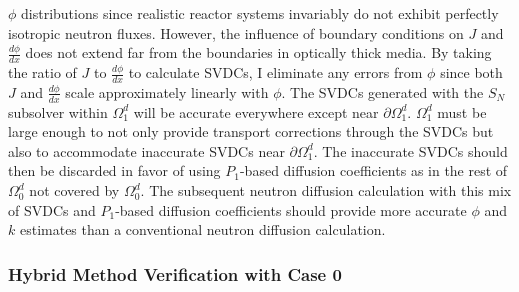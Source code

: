 $\phi$ distributions since realistic reactor systems invariably do not exhibit perfectly isotropic
neutron fluxes. However, the influence of boundary conditions on $J$ and $\frac{d\phi}{dx}$ does
not extend far from the boundaries in optically thick media. By taking the ratio of $J$
to $\frac{d\phi}{dx}$ to calculate \glspl{SVDC}, I eliminate any errors from $\phi$ since both
$J$ and $\frac{d\phi}{dx}$ scale approximately linearly with $\phi$. The \glspl{SVDC}
generated with the $S_N$ subsolver within $\Omega^d_1$ will be accurate everywhere except near
$\partial\Omega^d_1$. $\Omega^d_1$ must be large enough to not only provide transport corrections
through the \glspl{SVDC} but also to accommodate inaccurate \glspl{SVDC} near
$\partial\Omega^d_1$. The inaccurate \glspl{SVDC} should then be discarded in favor of using
$P_1$-based diffusion coefficients as in the rest of $\Omega^d_0$ not covered by $\Omega^d_0$. The
subsequent neutron diffusion calculation with this mix of \glspl{SVDC} and $P_1$-based diffusion
coefficients should provide more accurate $\phi$ and $k$ estimates than a conventional
neutron diffusion calculation.


\subsubsection{Hybrid Method Verification with Case 0}

